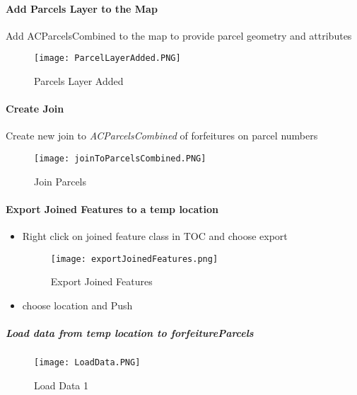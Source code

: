  \paragraph{Add Parcels Layer to the Map}
 \vspace{.3in}

 Add ACParcelsCombined to the map to provide parcel geometry and attributes
 \vspace{.25in}

 \begin{figure}[h!]
 \centering
     \texttt{[image: ParcelLayerAdded.PNG]}
 \caption{Parcels Layer Added}
 \end{figure}
 \clearpage
 \paragraph{Create Join}
 \vspace{.3in}

 Create new join to \emph{ACParcelsCombined} of forfeitures on parcel numbers
 \vspace{.25in}

 \begin{figure}[h!]
 \centering
     \texttt{[image: joinToParcelsCombined.PNG]}
 \caption{Join Parcels}
 \end{figure}
 \clearpage
 \paragraph[Export Joined Features]{Export Joined Features to a temp location \texorpdfstring{\\}{}}
 \begin{itemize}
 \item Right click \rtArrow  on joined feature class in TOC and choose export
 \begin{figure}[h!]
 \centering
     \texttt{[image: exportJoinedFeatures.png]}
 \caption{Export Joined Features}
 \end{figure}
 \item choose location and Push 
 \end{itemize}
 \clearpage
 \subparagraph[Load data to forfeitureParcels]{\Large Load data from temp location to forfeitureParcels}
 \subparagraph*{}
 \begin{figure}[h!]
 \centering
     \texttt{[image: LoadData.PNG]}
 \caption{Load Data 1}
 \end{figure}
 \clearpage
